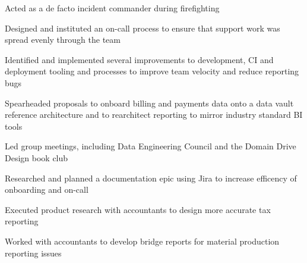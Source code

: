 \begin{job}


  \begin{accomplishments}
    \item Acted as a de facto incident commander during firefighting
    \item Designed and instituted an on-call process to ensure that
    support work was spread evenly through the team
    \item Identified and implemented several improvements to development, CI and
    deployment tooling and processes to improve team velocity and reduce
    reporting bugs
    \item Spearheaded proposals to onboard billing and payments data onto a data
    vault reference architecture and to rearchitect reporting to mirror industry
    standard BI tools
    \item Led group meetings, including Data Engineering Council and the Domain
    Drive Design book club
    \item Researched and planned a documentation epic using Jira to increase
    efficency of onboarding and on-call
    \item Executed product research with accountants to design more accurate tax
    reporting
    \item Worked with accountants to develop bridge reports for material
    production reporting issues
  \end{accomplishments}
\end{job}
